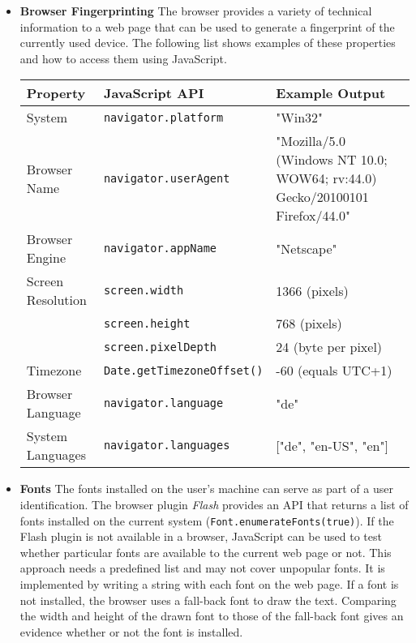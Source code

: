 	\begin{itemize}
		\item \textbf{Browser Fingerprinting} The browser provides a variety of technical information to a web page that can be used to generate a fingerprint of the currently used device. The following list shows examples of these properties and how to access them using JavaScript. 
		
		\begin{tabular}{|l|l|p{}|} \hline
			\textbf{Property} & \textbf{JavaScript API} & \textbf{Example Output} \\ \hline
			System & \texttt{navigator.platform} & "Win32" \\ \hline
			Browser Name & \texttt{navigator.userAgent} & "Mozilla/5.0 (Windows NT 10.0; WOW64; rv:44.0) Gecko/20100101 Firefox/44.0" \\ \hline
			Browser Engine & \texttt{navigator.appName} & "Netscape" \\ \hline
			Screen Resolution & \texttt{screen.width} & 1366 (pixels) \\
			& \texttt{screen.height} & 768 (pixels) \\
			& \texttt{screen.pixelDepth} & 24 (byte per pixel) \\ \hline
			Timezone & \texttt{Date.getTimezoneOffset()} & -60 (equals UTC+1) \\ \hline
			Browser Language & \texttt{navigator.language} & "de" \\ \hline
			System Languages & \texttt{navigator.languages} & ["de", "en-US", "en"] \\ \hline
		\end{tabular}
		
		\item \textbf{Fonts} The fonts installed on the user's machine can serve as part of a user identification. The browser plugin \textit{Flash} provides an API that returns a list of fonts installed on the current system (\texttt{Font.enumerateFonts(true)})\cite{flashPlayerGetFonts}. If the Flash plugin is not available in a browser, JavaScript can be used to test whether particular fonts are available to the current web page or not. This approach needs a predefined list and may not cover unpopular fonts. It is implemented by writing a string with each font on the web page. If a font is not installed, the browser uses a fall-back font to draw the text. Comparing the width and height of the drawn font to those of the fall-back font gives an evidence whether or not the font is installed.
		

\end{itemize}
